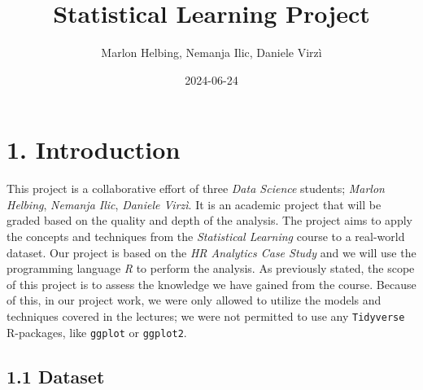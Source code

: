 \documentclass[
]{article}
\title{Statistical Learning Project}
\author{Marlon Helbing, Nemanja Ilic, Daniele Virzì}
\date{2024-06-24}
\begin{document}
\maketitle

\hypertarget{introduction}{%
\section{1. Introduction}\label{introduction}}

This project is a collaborative effort of three \emph{Data Science}
students; \emph{Marlon Helbing}, \emph{Nemanja Ilic}, \emph{Daniele
Virzì}. It is an academic project that will be graded based on the
quality and depth of the analysis. The project aims to apply the
concepts and techniques from the \emph{Statistical Learning} course to a
real-world dataset. Our project is based on the \emph{HR Analytics Case
Study} and we will use the programming language \emph{R} to perform the
analysis. As previously stated, the scope of this project is to assess
the knowledge we have gained from the course. Because of this, in our
project work, we were only allowed to utilize the models and techniques
covered in the lectures; we were not permitted to use any
\texttt{Tidyverse} R-packages, like \texttt{ggplot} or \texttt{ggplot2}.

\hypertarget{dataset}{%
\subsection{1.1 Dataset}\label{dataset}}
\end{document}

